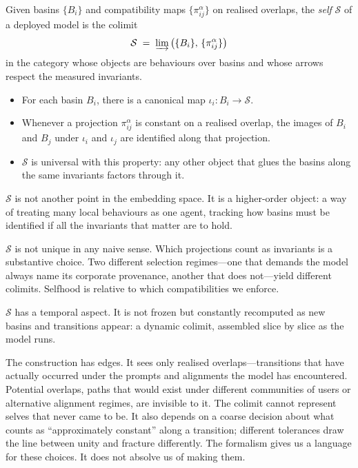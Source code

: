 \documentclass[12pt,a4paper]{article}
\begin{document}
\begin{formalbox}[title={Self as Colimit of Basins}]
Given basins $\{B_i\}$ and compatibility maps $\{\pi_{ij}^\alpha\}$ on realised overlaps, the \emph{self} $\mathcal{S}$ of a deployed model is the colimit
\[
\mathcal{S} \;=\; \varinjlim \big(\{B_i\},\, \{\pi_{ij}^\alpha\}\big)
\]
in the category whose objects are behaviours over basins and whose arrows respect the measured invariants.

\begin{itemize}
  \item For each basin $B_i$, there is a canonical map $\iota_i : B_i \to \mathcal{S}$.
  \item Whenever a projection $\pi_{ij}^\alpha$ is constant on a realised overlap, the images of $B_i$ and $B_j$ under $\iota_i$ and $\iota_j$ are identified along that projection.
  \item $\mathcal{S}$ is universal with this property: any other object that glues the basins along the same invariants factors through it.
\end{itemize}
\end{formalbox}

$\mathcal{S}$ is not another point in the embedding space. It is a higher-order object: a way of treating many local behaviours as one agent, tracking how basins must be identified if all the invariants that matter are to hold.

$\mathcal{S}$ is not unique in any naive sense. Which projections count as invariants is a substantive choice. Two different selection regimes---one that demands the model always name its corporate provenance, another that does not---yield different colimits. Selfhood is relative to which compatibilities we enforce.

$\mathcal{S}$ has a temporal aspect. It is not frozen but constantly recomputed as new basins and transitions appear: a dynamic colimit, assembled slice by slice as the model runs.

The construction has edges. It sees only realised overlaps---transitions that have actually occurred under the prompts and alignments the model has encountered. Potential overlaps, paths that would exist under different communities of users or alternative alignment regimes, are invisible to it. The colimit cannot represent selves that never came to be. It also depends on a coarse decision about what counts as ``approximately constant'' along a transition; different tolerances draw the line between unity and fracture differently. The formalism gives us a language for these choices. It does not absolve us of making them.
\end{document}

